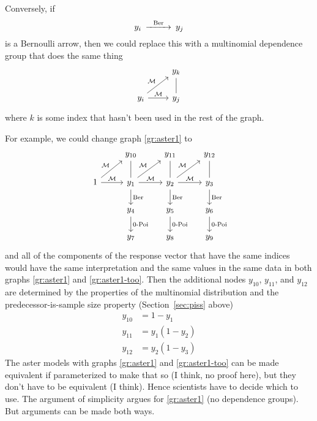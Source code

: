 Conversely, if
$$
\begin{CD}
   y_i @>\text{Ber}>> y_j
\end{CD}
$$
is a Bernoulli arrow, then we could replace this with a multinomial dependence
group that does the same thing
$$
\begin{tikzcd}
  \hphantom{1} & y_k
  \\
  y_i
  \arrow{r}{\mathcal{M}}
  \arrow{ru}{\mathcal{M}}
  & y_j
  \arrow[dash]{u}
\end{tikzcd}
$$
where $k$ is some index that hasn't been used in the rest of the graph.

For example, we could change graph \eqref{gr:aster1} to
\begin{equation} \label{gr:aster1-too}
\begin{tikzcd}
  \hphantom{1} & y_{10} & y_{11} & y_{12}
  \\
  1
  \arrow{r}{\mathcal{M}}
  \arrow{ru}{\mathcal{M}}
  & y_1
  \arrow[dash]{u}
  \arrow{d}{\text{Ber}}
  \arrow{r}{\mathcal{M}}
  \arrow{ru}{\mathcal{M}}
  & y_2
  \arrow[dash]{u}
  \arrow{d}{\text{Ber}}
  \arrow{r}{\mathcal{M}}
  \arrow{ru}{\mathcal{M}}
  & y_3
  \arrow[dash]{u}
  \arrow{d}{\text{Ber}}
  \\
  \hphantom{1} & y_4 \arrow{d}{\text{0-Poi}}
  & y_5 \arrow{d}{\text{0-Poi}}
  & y_6 \arrow{d}{\text{0-Poi}}
  \\
  \hphantom{1} & y_7 & y_8 & y_9
\end{tikzcd}
\end{equation}
and all of the components of the response vector that have the same indices
would have the same interpretation and the same values in the same data
in both graphs \eqref{gr:aster1} and \eqref{gr:aster1-too}.
Then the additional nodes $y_{10}$, $y_{11}$, and $y_{12}$ are determined
by the properties of the multinomial distribution
and the predecessor-is-sample size property (Section~\ref{sec:piss} above)
\begin{equation} \label{eq:bernoulli-multinomial-constraints}
\begin{split}
   y_{10} & = 1 - y_1
   \\
   y_{11} & = y_1 (1 - y_2)
   \\
   y_{12} & = y_2 (1 - y_3)
\end{split}
\end{equation}
The aster models with graphs \eqref{gr:aster1} and \eqref{gr:aster1-too}
can be made equivalent if parameterized to make that so (I think, no proof
here), but they don't have to be equivalent (I think).
Hence scientists have to decide which to use.  The argument of simplicity
argues for \eqref{gr:aster1} (no dependence groups).
But arguments can be made both ways.

